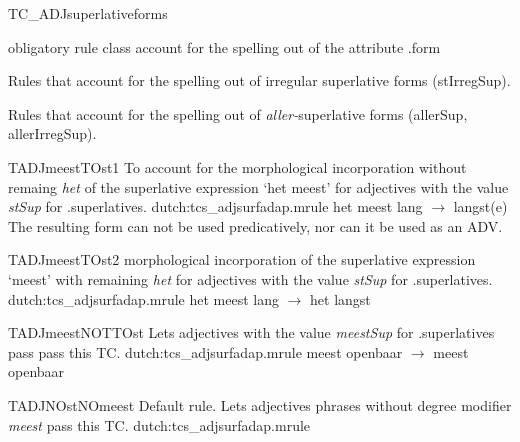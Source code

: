 \begin{mruleclass}{TC\_ADJsuperlativeforms}
\begin{classdescr}
\kind obligatory rule class
\classtask account for the spelling out of the attribute .form
\classremarks
\nofilters

\nospeedrules

\begin{plannedrules}
\item  Rules that account for the spelling 
out of irregular superlative forms (stIrregSup).
\item  Rules that account for the spelling out of {\em aller-}superlative 
forms (allerSup, allerIrregSup).
\end{plannedrules}

\end{classdescr}

\begin{members}

\begin{member}
 TADJmeestTOst1
 To account for the 
morphological incorporation without remaing {\em het} of the superlative
expression `het meest'
for adjectives with the value {\em stSup} for .superlatives.
\file dutch:tcs\_adjsurfadap.mrule
\semantics \nosemantics
\example het meest lang $\rightarrow$ langst(e)
\remarks\mbox{}
The resulting form can not be used predicatively, nor can it be used as an ADV.

\end{member}
\begin{member}
 TADJmeestTOst2
 morphological incorporation of the superlative
expression `meest' with remaining {\em het}
for adjectives with the value {\em stSup} for .superlatives.
\file dutch:tcs\_adjsurfadap.mrule
\semantics \nosemantics
\example het meest lang $\rightarrow$ het langst 
\remarks\mbox{}

\end{member}
\begin{member}
 TADJmeestNOTTOst
 Lets adjectives with the value {\em meestSup}
for .superlatives pass pass this TC.
\file dutch:tcs\_adjsurfadap.mrule
\semantics \nosemantics
\example meest openbaar $\rightarrow $ meest openbaar
\remarks\mbox{}
\end{member}

\begin{member}
 TADJNOstNOmeest
 Default rule. Lets adjectives phrases without 
degree modifier {\em meest}
pass this TC.
\file dutch:tcs\_adjsurfadap.mrule
\semantics \nosemantics
\example 
\remarks\mbox{}

\end{member}
\end{members}

\end{mruleclass}



